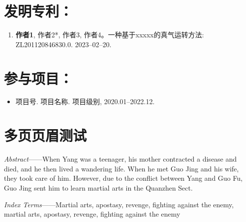 \documentclass[print, doctor, vlined]{DissertUESTC}
\begin{document}
	\section*{发明专利：}
	

	\begin{enumerate}
		
		\item \textbf{作者1}, 作者2*, 作者3, 作者4。一种基于xxxxx的真气运转方法: ZL201120846830.0. 2023--02--20.
		
	\end{enumerate}
	
	\section*{参与项目：}
	
	\begin{itemize}
		\item 项目号. 项目名称. 项目级别, 2020.01--2022.12.
	\end{itemize}

	\newpage
	\section*{多页页眉测试}



	\textit{Abstract}——When Yang was a teenager, his mother contracted a disease and died, and he then lived a wandering life. When he met Guo Jing and his wife, they took care of him. However, due to the conflict between Yang and Guo Fu, Guo Jing sent him to learn martial arts in the Quanzhen Sect.

	\textit{Index Terms}——Martial arts, apostasy, revenge, fighting against the enemy, martial arts, apostasy, revenge, fighting against the enemy

\end{document}

